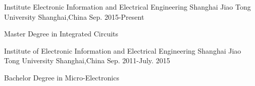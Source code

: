 \begin{cventries}
  \cventry
    {\hspace{10pt}Institute Electronic Information and Electrical Engineering}
    {Shanghai Jiao Tong University}
    {Shanghai,China}
    {Sep. 2015-Present}
    {
      \begin{cvitems}
        \item {\hspace{10pt}Master Degree in Integrated Circuits}
      \end{cvitems}
    }
\cventry
{\hspace{10pt}Institute of Electronic Information and Electrical Engineering}
    {Shanghai Jiao Tong University}
    {Shanghai,China}
    {Sep. 2011-July. 2015}
	{
      \begin{cvitems}
        \item {\hspace{10pt}Bachelor Degree in Micro-Electronics}
      \end{cvitems}
    }
\end{cventries}

